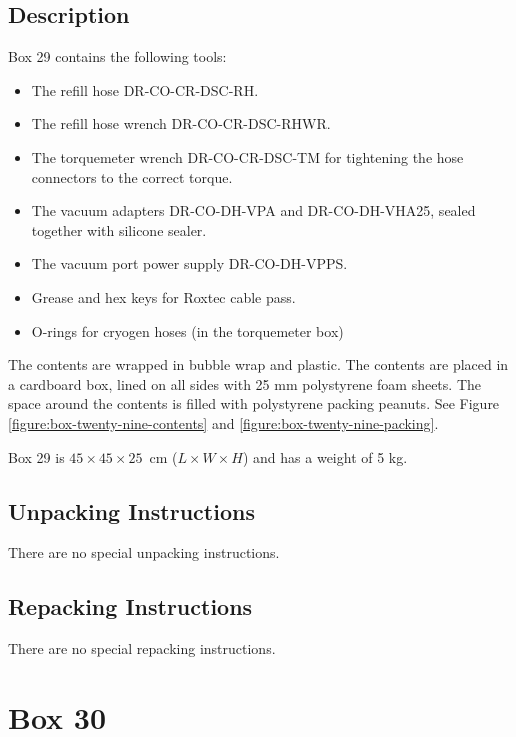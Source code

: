 \documentclass{article}
\begin{document}
\subsection{Description}

Box 29 contains the following tools:

\begin{itemize}
    \item The refill hose DR-CO-CR-DSC-RH.
    \item The refill hose wrench DR-CO-CR-DSC-RHWR.
    \item The torquemeter wrench DR-CO-CR-DSC-TM for tightening the hose connectors to the correct torque.
    \item The vacuum adapters DR-CO-DH-VPA and DR-CO-DH-VHA25, sealed together with silicone sealer.
    \item The vacuum port power supply DR-CO-DH-VPPS.
    \item Grease and hex keys for Roxtec cable pass.
    \item O-rings for cryogen hoses (in the torquemeter box)
\end{itemize}

The contents are wrapped in bubble wrap and plastic.  The contents are placed in a cardboard box, lined on all sides with 25 mm polystyrene foam sheets. The space around the contents is filled with polystyrene packing peanuts. See Figure \ref{figure:box-twenty-nine-contents} and \ref{figure:box-twenty-nine-packing}.

Box 29 is $45 \times 45 \times 25$~cm ($L \times W \times H$) and has a weight of 5 kg.

\subsection{Unpacking Instructions}

There are no special unpacking instructions.

\subsection{Repacking Instructions}

There are no special repacking instructions.


\clearpage
\section{Box 30}
\end{document}
